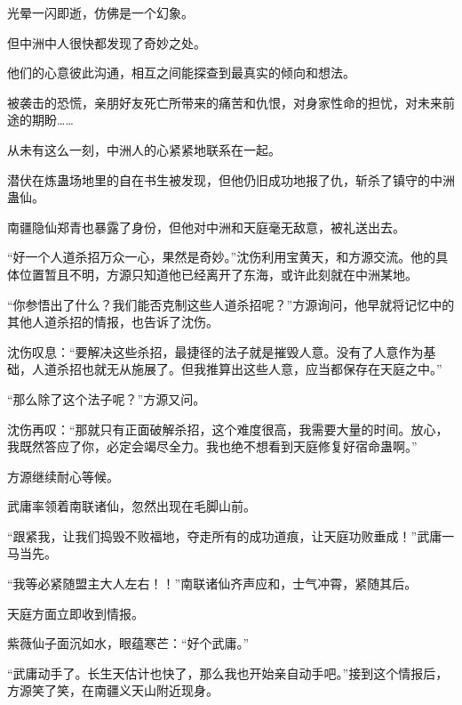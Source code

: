 \begin{this_body}
光晕一闪即逝，仿佛是一个幻象。

但中洲中人很快都发现了奇妙之处。

他们的心意彼此沟通，相互之间能探查到最真实的倾向和想法。

被袭击的恐慌，亲朋好友死亡所带来的痛苦和仇恨，对身家性命的担忧，对未来前途的期盼……

从未有这么一刻，中洲人的心紧紧地联系在一起。

潜伏在炼蛊场地里的自在书生被发现，但他仍旧成功地报了仇，斩杀了镇守的中洲蛊仙。

南疆隐仙郑青也暴露了身份，但他对中洲和天庭毫无敌意，被礼送出去。

“好一个人道杀招万众一心，果然是奇妙。”沈伤利用宝黄天，和方源交流。他的具体位置暂且不明，方源只知道他已经离开了东海，或许此刻就在中洲某地。

“你参悟出了什么？我们能否克制这些人道杀招呢？”方源询问，他早就将记忆中的其他人道杀招的情报，也告诉了沈伤。

沈伤叹息：“要解决这些杀招，最捷径的法子就是摧毁人意。没有了人意作为基础，人道杀招也就无从施展了。但我推算出这些人意，应当都保存在天庭之中。”

“那么除了这个法子呢？”方源又问。

沈伤再叹：“那就只有正面破解杀招，这个难度很高，我需要大量的时间。放心，我既然答应了你，必定会竭尽全力。我也绝不想看到天庭修复好宿命蛊啊。”

方源继续耐心等候。

武庸率领着南联诸仙，忽然出现在毛脚山前。

“跟紧我，让我们捣毁不败福地，夺走所有的成功道痕，让天庭功败垂成！”武庸一马当先。

“我等必紧随盟主大人左右！！”南联诸仙齐声应和，士气冲霄，紧随其后。

天庭方面立即收到情报。

紫薇仙子面沉如水，眼蕴寒芒：“好个武庸。”

“武庸动手了。长生天估计也快了，那么我也开始亲自动手吧。”接到这个情报后，方源笑了笑，在南疆义天山附近现身。

\end{this_body}

